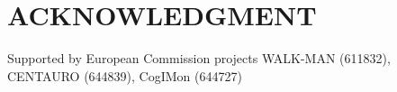 \documentclass[letterpaper, 10 pt, conference]{ieeeconf}  %
\begin{document}
	
	
	
	
	
	\section{ACKNOWLEDGMENT}
	Supported by European Commission projects WALK-MAN (611832), CENTAURO (644839), CogIMon (644727)
	
	
	
	
	
	
	
\end{document}

